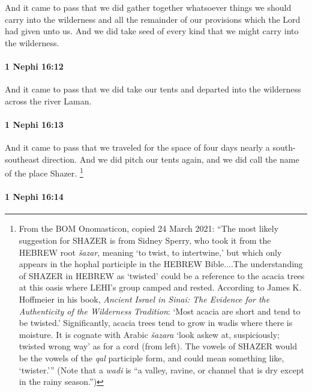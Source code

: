 			And it came to pass that we did gather together
			whatsoever things we should carry into the wilderness
			and all the remainder of our provisions which the Lord had given unto us.
			And we did take seed of every kind that we might carry into the wilderness.

		\paragraph{1 Nephi 16:12} %
			\label{1NEPHI-16-12}

			And it came to pass that we did take our tents
			and departed into the wilderness across the river Laman.

		\paragraph{1 Nephi 16:13} %
			\label{1NEPHI-16-13}

			And it came to pass that we traveled for the space of four days
			nearly a south-southeast direction.
			And we did pitch our tents again,
			and we did call the name of the place Shazer.%
				\footnote{%
					\label{1NEPHI-16-13-shazer}%
					From the BOM Onomasticon, copied 24 March 2021: ``The most likely suggestion for \textsc{SHAZER} is from Sidney Sperry, who took it from the \textsc{HEBREW} root \textit{\v{s}azar}, meaning `to twist, to intertwine,' but which only appears in the hophal participle in the \textsc{HEBREW} Bible....The understanding of \textsc{SHAZER} in \textsc{HEBREW} as `twisted' could be a reference to the acacia trees at this oasis where \textsc{LEHI}'s group camped and rested. According to James K. Hoffmeier in his book, \textit{Ancient Israel in Sinai: The Evidence for the Authenticity of the Wilderness Tradition}: `Most acacia are short and tend to be twisted.' Significantly, acacia trees tend to grow in wadis where there is moisture. It is cognate with Arabic \textit{\v{s}azara} `look askew at, suspiciously; twisted wrong way' as for a cord (from left). The vowels of \textsc{SHAZER} would be the vowels of the \textit{qal} participle form, and could mean something like, `twister.''' (Note that a \textit{wadi} is ``a valley, ravine, or channel that is dry except in the rainy season.'')
					}

		\paragraph{1 Nephi 16:14} %
			\label{1NEPHI-16-14}

